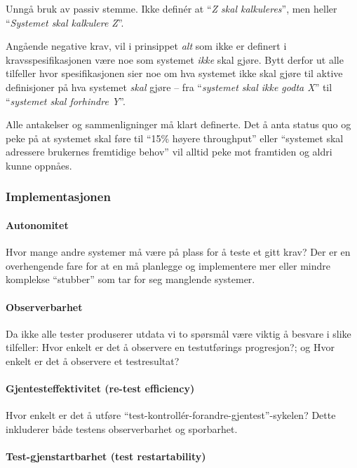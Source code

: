 Unngå bruk av passiv stemme. Ikke definér at ``\emph{Z skal
kalkuleres}'', men heller ``\emph{Systemet skal kalkulere Z}''.

Angående negative krav, vil i prinsippet \emph{alt} som ikke er definert
i kravsspesifikasjonen være noe som systemet \emph{ikke} skal gjøre.
Bytt derfor ut alle tilfeller hvor spesifikasjonen sier noe om hva
systemet ikke skal gjøre til aktive definisjoner på hva systemet
\emph{skal} gjøre -- fra ``\emph{systemet skal ikke godta X}'' til
``\emph{systemet skal forhindre Y}''.

Alle antakelser og sammenligninger må klart definerte. Det å anta status
quo og peke på at systemet skal føre til ``15\% høyere throughput''
eller ``systemet skal adressere brukernes fremtidige behov'' vil alltid
peke mot framtiden og aldri kunne oppnåes.

\subsubsection{Implementasjonen}

\paragraph{Autonomitet}

Hvor mange andre systemer må være på plass for å teste et gitt krav? Der
er en overhengende fare for at en må planlegge og implementere mer eller
mindre komplekse ``stubber'' som tar for seg manglende systemer.

\paragraph{Observerbarhet}

Da ikke alle tester produserer utdata vi to spørsmål være viktig å
besvare i slike tilfeller: Hvor enkelt er det å observere en
testutførings progresjon?; og Hvor enkelt er det å observere et
testresultat?

\paragraph{Gjentesteffektivitet (re-test efficiency)}

Hvor enkelt er det å utføre
``test-kontrollér-forandre-gjentest''-sykelen? Dette inkluderer både
testens observerbarhet og sporbarhet.

\paragraph{Test-gjenstartbarhet (test restartability)}

